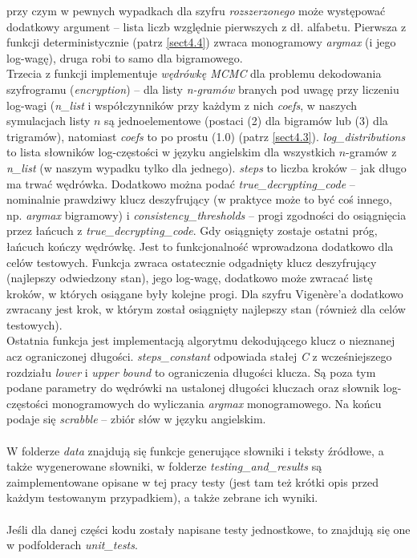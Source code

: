 \documentclass[a4paper]{article}
\theoremstyle{defn}
\theoremstyle{theorem}
\theoremstyle{lemma}
\theoremstyle{cor}
\theoremstyle{fact}
\begin{document}
przy czym w pewnych wypadkach dla szyfru \textit{rozszerzonego} może występować dodatkowy argument – lista liczb względnie pierwszych z dł. alfabetu.
Pierwsza z funkcji deterministycznie (patrz \ref{sect4.4}) zwraca monogramowy \textit{argmax} (i jego log-wagę), druga robi to samo dla bigramowego. \\
Trzecia z funkcji implementuje \textit{wędrówkę MCMC} dla problemu dekodowania szyfrogramu (\textit{encryption}) – dla listy \textit{n-gramów} branych pod uwagę przy liczeniu log-wagi (\textit{n\_list} i współczynników przy każdym z nich \textit{coefs}, w naszych symulacjach listy $n$ są jednoelementowe (postaci (2) dla bigramów lub (3) dla trigramów), natomiast \textit{coefs} to po prostu (1.0) (patrz \ref{sect4.3}). \textit{log\_distributions} to lista słowników log-częstości w języku angielskim dla wszystkich $n$-gramów z \textit{n\_list} (w naszym wypadku tylko dla jednego). \textit{steps} to liczba kroków – jak długo ma trwać wędrówka. Dodatkowo można podać \textit{true\_decrypting\_code} – nominalnie prawdziwy klucz deszyfrujący (w praktyce może to być coś innego, np. \textit{argmax} bigramowy) i \textit{consistency\_thresholds} – progi zgodności do osiągnięcia przez łańcuch z \textit{true\_decrypting\_code}. Gdy osiągnięty zostaje ostatni próg, łańcuch kończy wędrówkę. Jest to funkcjonalność wprowadzona dodatkowo dla celów testowych. Funkcja zwraca ostatecznie odgadnięty klucz deszyfrujący (najlepszy odwiedzony stan), jego log-wagę, dodatkowo może zwracać listę kroków, w których osiągane były kolejne progi. Dla szyfru Vigenère'a dodatkowo zwracany jest krok, w którym został osiągnięty najlepszy stan (również dla celów testowych).\\
Ostatnia funkcja jest implementacją algorytmu dekodującego klucz o nieznanej acz ograniczonej długości. \textit{steps\_constant} odpowiada stałej \textit{C} z wcześniejszego rozdziału \textit{lower} i \textit{upper bound} to ograniczenia długości klucza. Są poza tym podane parametry do wędrówki na ustalonej długości kluczach oraz słownik log-częstości monogramowych do wyliczania \textit{argmax} monogramowego. Na końcu podaje się \textit{scrabble} – zbiór słów w języku angielskim.\\\\
W folderze \textit{data} znajdują się funkcje generujące słowniki i teksty źródłowe, a także wygenerowane słowniki, w folderze \textit{testing\_and\_results} są zaimplementowane opisane w tej pracy testy (jest tam też krótki opis przed każdym testowanym przypadkiem), a także zebrane ich wyniki.\\\\
Jeśli dla danej części kodu zostały napisane testy jednostkowe, to znajdują się one w podfolderach \textit{unit\_tests}.
\end{document}

